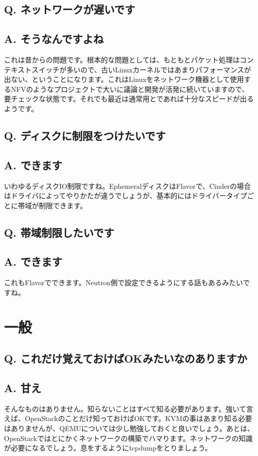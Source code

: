 \documentclass[9pt,b5paper,tombo,openany]{jsbook}
\begin{document}
\subsection*{{\LARGE\bfseries Q.} ネットワークが遅いです}
\subsection*{{\LARGE\bfseries A.} そうなんですよね}
これは昔からの問題です。根本的な問題としては、もともとパケット処理はコンテキストスイッチが多いので、古いLinuxカーネルではあまりパフォーマンスが出ない、ということになります。これはLinuxをネットワーク機器として使用するNFVのようなプロジェクトで大いに議論と開発が活発に続いていますので、要チェックな状態です。それでも最近は通常用とであれば十分なスピードが出るようです。

\subsection*{{\LARGE\bfseries Q.} ディスクに制限をつけたいです}
\subsection*{{\LARGE\bfseries A.} できます}
いわゆるディスクIO制限ですね。EphemeralディスクはFlavorで、Cinderの場合はドライバによってやりかたが違うでしょうが、基本的にはドライバータイプごとに帯域が制限できます。

\subsection*{{\LARGE\bfseries Q.} 帯域制限したいです}
\subsection*{{\LARGE\bfseries A.} できます}
これもFlavorでできます。Neutron側で設定できるようにする話もあるみたいですね。

\section{一般}

\subsection*{{\LARGE\bfseries Q.} これだけ覚えておけばOKみたいなのありますか}
\subsection*{{\LARGE\bfseries A.} 甘え}
そんなものはありません。知らないことはすべて知る必要があります。強いて言えば、OpenStackのことだけ知っておけばOKです。KVMの事はあまり知る必要はありませんが、QEMUについては少し勉強しておくと良いでしょう。あとは、OpenStackではとにかくネットワークの構築でハマります。ネットワークの知識が必要になるでしょう。息をするようにtcpdumpをとりましょう。
\end{document}
